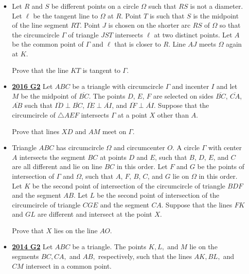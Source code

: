 \documentclass[11pt]{scrartcl}
\begin{document}
\begin{itemize}[leftmargin=*]
Prove that the quadrilateral $APXY$ is cyclic.
\item {}  Let $R$ and $S$ be different points on a circle $\Omega$ such that $RS$ is not a diameter. Let $\ell$ be the tangent line to $\Omega$ at $R$. Point $T$ is such that $S$ is the midpoint of the line segment $RT$. Point $J$ is chosen on the shorter arc $RS$ of $\Omega$ so that the circumcircle $\Gamma$ of triangle $JST$ intersects $\ell$ at two distinct points. Let $A$ be the common point of $\Gamma$ and $\ell$ that is closer to $R$. Line $AJ$ meets $\Omega$ again at $K$. 

Prove that the line $KT$ is tangent to $\Gamma$.

\item \href{https://artofproblemsolving.com/community/c6h1480699p8639270}{\textbf{2016 G2}} Let $ABC$ be a triangle with circumcircle $\Gamma$ and incenter $I$ and let $M$ be the midpoint of $\overline{BC}$. The points $D$, $E$, $F$ are selected on sides $\overline{BC}$, $\overline{CA}$, $\overline{AB}$ such that $\overline{ID} \perp \overline{BC}$, $\overline{IE}\perp \overline{AI}$, and $\overline{IF}\perp \overline{AI}$. Suppose that the circumcircle of $\triangle AEF$ intersects $\Gamma$ at a point $X$ other than $A$. 

Prove that lines $XD$ and $AM$ meet on $\Gamma$.
\item {}  Triangle $ABC$ has circumcircle $\Omega$ and circumcenter $O$. A circle $\Gamma$ with center $A$ intersects the segment $BC$ at points $D$ and $E$, such that $B$, $D$, $E$, and $C$ are all different and lie on line $BC$ in this order. Let $F$ and $G$ be the points of intersection of $\Gamma$ and $\Omega$, such that $A$, $F$, $B$, $C$, and $G$ lie on $\Omega$ in this order. Let $K$ be the second point of intersection of the circumcircle of triangle $BDF$ and the segment $AB$. Let $L$ be the second point of intersection of the circumcircle of triangle $CGE$ and the segment $CA$. Suppose that the lines $FK$ and $GL$ are different and intersect at the point $X$. 

Prove that $X$ lies on the line $AO$.
\item \href{https://artofproblemsolving.com/community/c6h1113190p5083557}{\textbf{2014 G2}} 	Let $ABC$ be a triangle. The points $K, L,$ and $M$ lie on the segments $BC, CA,$ and $AB,$ respectively, such that the lines $AK, BL,$ and $CM$ intersect in a common point. 


\end{itemize}
\end{document}
